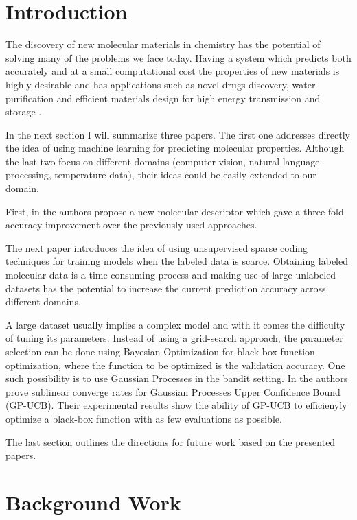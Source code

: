 \documentclass[10pt,journal,a4paper]{IEEEtran}
\begin{document}
\IEEEpeerreviewmaketitle


\section{Introduction}

The discovery of new molecular materials in chemistry has the potential of solving many of the problems we face today.
Having a system which predicts both accurately and at a small computational cost the properties of new materials is highly desirable and has applications such as novel drugs discovery, water purification and efficient materials design for high energy transmission and storage \cite{cleanenergy}. 
 
In the next section I will summarize three papers. The first one\cite{montavon2012learning} addresses directly the idea of using machine learning for predicting molecular properties. Although the last two focus on different domains (computer vision, natural language processing, temperature data), their ideas could be easily extended to our domain.

First, in \cite{montavon2012learning}
the authors propose a new molecular descriptor which gave a three-fold accuracy improvement over the previously used approaches. 

The next paper \cite{selftaughtl} introduces the idea of using unsupervised sparse coding techniques for training models when the labeled data is scarce. Obtaining labeled molecular data is a time consuming process and making use of large unlabeled datasets has the potential to increase the current prediction accuracy across different domains. 

A large dataset usually implies a complex model and with it comes the difficulty of tuning its parameters. Instead of using a grid-search approach, the parameter selection can be done using Bayesian Optimization for black-box function optimization, where the function to be optimized is the validation accuracy. One such possibility is to use Gaussian Processes in the bandit setting. In \cite{srinivas12information} the authors prove sublinear converge rates for Gaussian Processes Upper Confidence Bound (GP-UCB). Their experimental results show the ability of GP-UCB to efficienyly optimize a black-box function with as few evaluations as possible.

The last section outlines the directions for future work based on the presented papers.

\section{Background Work}
\end{document}
